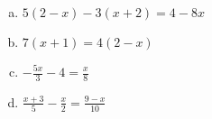 \documentclass[a4paper,14pt]{article}
\begin{document}
\begin{multicols}{2}
\begin{enumerate}
\begin{enumerate}[a)]
    			\item $5(2 - x) - 3(x + 2) = 4 - 8x$
    			\item $7(x + 1) = 4(2 - x)$
    			\item $- \frac{5x}{3} - 4 = \frac{x}{8}$
    			\item $\frac{x + 3}{5} - \frac{x}{2} = \frac{9 - x}{10}$
    		\end{enumerate}
    	\end{enumerate}
    $~$ \\ $~$ \\ $~$ \\ $~$ \\ $~$ \\ $~$ \\ $~$ \\ $~$\\ $~$ \\ $~$ \\ $~$ \\ $~$ \\ $~$ \\ $~$ \\ $~$ \\ $~$ \\ $~$ \\ $~$ \\ $~$ \\ $~$ \\ $~$ \\ $~$ \\ $~$ \\
	\end{multicols}
\end{document}
